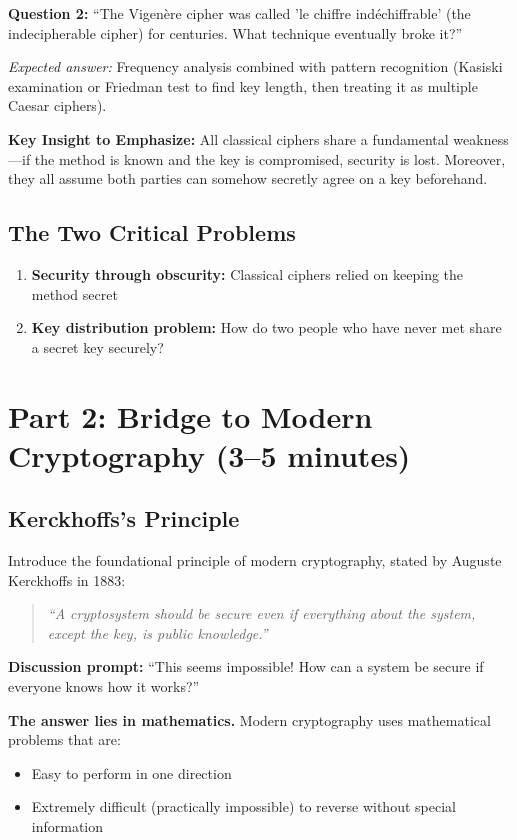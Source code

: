\documentclass[11pt]{article}
\begin{document}
\textbf{Question 2:} ``The Vigenère cipher was called 'le chiffre indéchiffrable' (the indecipherable cipher) for centuries. What technique eventually broke it?''

\textit{Expected answer:} Frequency analysis combined with pattern recognition (Kasiski examination or Friedman test to find key length, then treating it as multiple Caesar ciphers).

\vspace{0.3cm}

\textbf{Key Insight to Emphasize:} All classical ciphers share a fundamental weakness—if the method is known and the key is compromised, security is lost. Moreover, they all assume both parties can somehow secretly agree on a key beforehand.

\subsection*{The Two Critical Problems}
\begin{enumerate}
    \item \textbf{Security through obscurity:} Classical ciphers relied on keeping the method secret
    \item \textbf{Key distribution problem:} How do two people who have never met share a secret key securely?
\end{enumerate}

\section{Part 2: Bridge to Modern Cryptography (3--5 minutes)}

\subsection*{Kerckhoffs's Principle}
Introduce the foundational principle of modern cryptography, stated by Auguste Kerckhoffs in 1883:

\begin{quote}
\textit{``A cryptosystem should be secure even if everything about the system, except the key, is public knowledge.''}
\end{quote}

\textbf{Discussion prompt:} ``This seems impossible! How can a system be secure if everyone knows how it works?''

\vspace{0.3cm}

\textbf{The answer lies in mathematics.} Modern cryptography uses mathematical problems that are:
\begin{itemize}
    \item Easy to perform in one direction
    \item Extremely difficult (practically impossible) to reverse without special information
\end{itemize}
\end{document}
